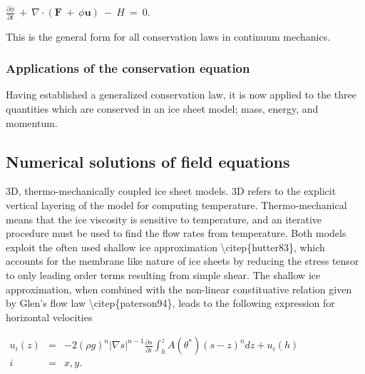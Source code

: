 $
{\frac{ \partial \phi }{ \partial t}} ~ + ~ \nabla {\cdot} 
    \left ( { {\mathbf F}~ + ~ \phi {\mathbf u}} \right ) ~ - ~H~ = ~ 0.
$

This is the general form for all conservation laws in continuum
mechanics.

\subsubsection{Applications of the conservation equation}

Having established a generalized conservation law, it is now applied to
the three quantities which are conserved in an ice sheet model; mass,
energy, and momentum.












\subsection{Numerical solutions of field equations}

3D, thermo-mechanically coupled ice sheet models. 3D refers to the
explicit vertical layering of the model for computing temperature.
Thermo-mechanical means that the ice viscosity is sensitive to
temperature, and an iterative procedure must be used to find the flow
rates from temperature. Both models exploit the often used shallow ice
approximation \textbackslash{}citep\{hutter83\}, which accounts for the
membrane like nature of ice sheets by reducing the stress tensor to only
leading order terms resulting from simple shear. The shallow ice
approximation, when combined with the non-linear constituative relation
given by Glen's flow law \textbackslash{}citep\{paterson94\}, leads to
the following expression for horizontal velocities

$\begin{matrix}
u_i(z) &=& -2 (\rho g)^n \vert \nabla s\vert ^{n-1} \frac{\partial s}{\partial i} 
\int_h^z A(\theta^*)(s-z)^n dz + u_i(h)\\
i &=& x,y.
\end{matrix}$


